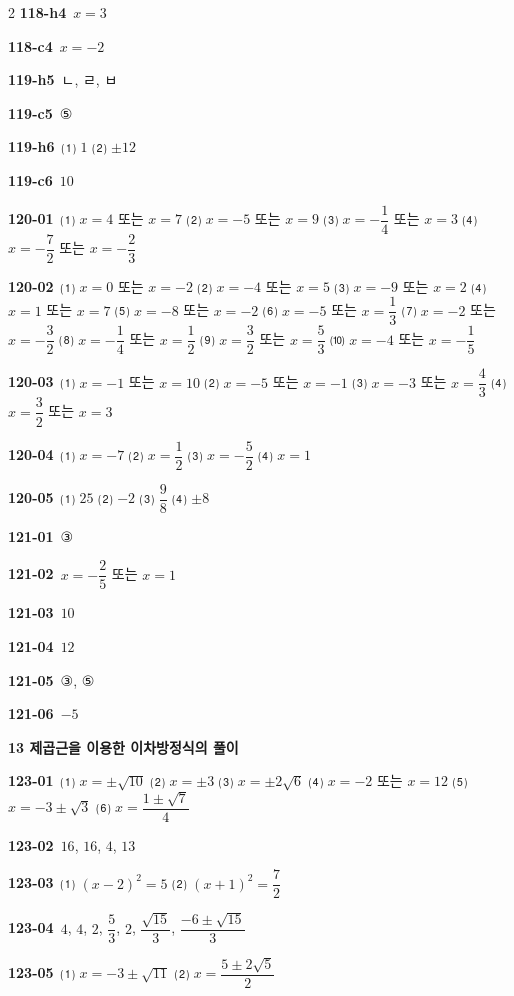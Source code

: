 \documentclass[10pt,a4paper]{article}
\begin{document}
\begin{multicols}{2}
\noindent\textbf{118-h4}\ $x=3$\par
\noindent\textbf{118-c4}\ $x=-2$\par
\noindent\textbf{119-h5}\ ㄴ, ㄹ, ㅂ\par
\noindent\textbf{119-c5}\ ⑤\par
\noindent\textbf{119-h6}\ ⑴ $1$ ⑵ $\pm 12$\par
\noindent\textbf{119-c6}\ $10$\par
\noindent\textbf{120-01}\ ⑴ $x=4$ 또는 $x=7$ ⑵ $x=-5$ 또는 $x=9$ ⑶ $x=-\dfrac{1}{4}$ 또는 $x=3$ ⑷ $x=-\dfrac{7}{2}$ 또는 $x=-\dfrac{2}{3}$\par
\noindent\textbf{120-02}\ ⑴ $x=0$ 또는 $x=-2$ ⑵ $x=-4$ 또는 $x=5$ ⑶ $x=-9$ 또는 $x=2$ ⑷ $x=1$ 또는 $x=7$ ⑸ $x=-8$ 또는 $x=-2$ ⑹ $x=-5$ 또는 $x=\dfrac{1}{3}$ ⑺ $x=-2$ 또는 $x=-\dfrac{3}{2}$ ⑻ $x=-\dfrac{1}{4}$ 또는 $x=\dfrac{1}{2}$ ⑼ $x=\dfrac{3}{2}$ 또는 $x=\dfrac{5}{3}$ ⑽ $x=-4$ 또는 $x=-\dfrac{1}{5}$\par
\noindent\textbf{120-03}\ ⑴ $x=-1$ 또는 $x=10$ ⑵ $x=-5$ 또는 $x=-1$ ⑶ $x=-3$ 또는 $x=\dfrac{4}{3}$ ⑷ $x=\dfrac{3}{2}$ 또는 $x=3$\par
\noindent\textbf{120-04}\ ⑴ $x=-7$ ⑵ $x=\dfrac{1}{2}$ ⑶ $x=-\dfrac{5}{2}$ ⑷ $x=1$\par
\noindent\textbf{120-05}\ ⑴ $25$ ⑵ $-2$ ⑶ $\dfrac{9}{8}$ ⑷ $\pm 8$\par
\noindent\textbf{121-01}\ ③\par
\noindent\textbf{121-02}\ $x=-\dfrac{2}{5}$ 또는 $x=1$\par
\noindent\textbf{121-03}\ $10$\par
\noindent\textbf{121-04}\ $12$\par
\noindent\textbf{121-05}\ ③, ⑤\par
\noindent\textbf{121-06}\ $-5$\par
\noindent\textbf{13 제곱근을 이용한 이차방정식의 풀이}\par\smallskip
\noindent\textbf{123-01}\ ⑴ $x=\pm\sqrt{10}$ ⑵ $x=\pm3$ ⑶ $x=\pm2\sqrt{6}$ ⑷ $x=-2$ 또는 $x=12$ ⑸ $x=-3\pm\sqrt{3}$ ⑹ $x=\dfrac{1\pm\sqrt{7}}{4}$\par
\noindent\textbf{123-02}\ $16$, $16$, $4$, $13$\par
\noindent\textbf{123-03}\ ⑴ $(x-2)^2=5$ ⑵ $(x+1)^2=\dfrac{7}{2}$\par
\noindent\textbf{123-04}\ $4$, $4$, $2$, $\dfrac{5}{3}$, $2$, $\dfrac{\sqrt{15}}{3}$, $\dfrac{-6\pm\sqrt{15}}{3}$\par
\noindent\textbf{123-05}\ ⑴ $x=-3\pm\sqrt{11}$ ⑵ $x=\dfrac{5\pm2\sqrt{5}}{2}$\par

\end{multicols}
\end{document}
